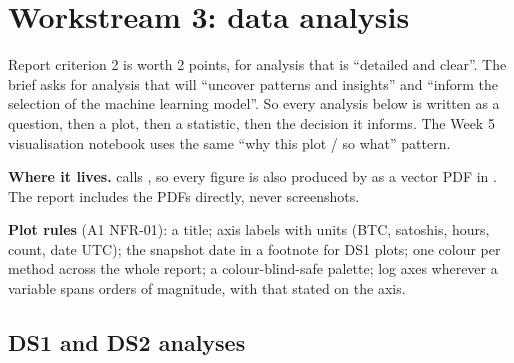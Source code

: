 \section{Workstream 3: data analysis}
\label{sec:analysis}

Report criterion 2 is worth 2 points, for analysis that is ``detailed and clear''. The brief
asks for analysis that will ``uncover patterns and insights'' and ``inform the selection of the
machine learning model''. So every analysis below is written as a question, then a plot, then a
statistic, then the decision it informs. The Week 5 visualisation notebook uses the same ``why
this plot / so what'' pattern.

\textbf{Where it lives.}  calls , so every
figure is also produced by  as a vector PDF in
. The report includes the PDFs directly, never screenshots.

\textbf{Plot rules} (A1 NFR-01): a title; axis labels with units (BTC, satoshis, hours, count,
date UTC); the snapshot date in a footnote for DS1 plots; one colour per method across the whole
report; a colour-blind-safe palette; log axes wherever a variable spans orders of magnitude, with
that stated on the axis.

\subsection{DS1 and DS2 analyses}

